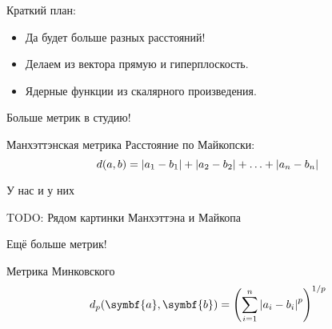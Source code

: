 \documentclass[14 pt,xcolor=dvipsnames]{beamer}
\newcommand{\ba}{\symbf{a}}
\newcommand{\bb}{\symbf{b}}
\begin{document}


\begin{frame} %



\end{frame}









\begin{frame} %


\end{frame}


\begin{frame}{Краткий план:}

\begin{itemize}[<+->]
  \item Да будет больше разных расстояний!
  \item Делаем из вектора прямую и гиперплоскость.
  \item Ядерные функции из скалярного произведения.
\end{itemize}

\end{frame}


\begin{frame}{Больше метрик в студию!}
 \begin{block}{Манхэттэнская метрика}
  Расстояние по Майкопски:
  \[
  d(a, b) = \abs{a_1 - b_1}  + \abs{a_2 - b_2} + \ldots + \abs{a_n - b_n}
  \]
 \end{block}

\end{frame}




\begin{frame}{У нас и у них}

 \begin{block}{TODO:}
 Рядом картинки Манхэттэна и Майкопа
 \end{block}

\end{frame}


\begin{frame}{Ещё больше метрик!}

\begin{block}{Метрика Минковского}
  \[
      d_p(\ba, \bb) = \left(\sum_{i=1}^n \abs{a_i - b_i}^p \right)^{1/p}
  \]
\end{block}
\end{frame}
\end{document}
